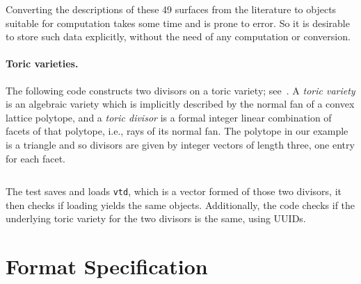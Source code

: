 \documentclass[runningheads]{llncs}
\newcommand\OSCAR{\texttt{OSCAR}\xspace}
\newcommand\msolve{\texttt{msolve}\xspace}
\begin{document}

Converting the descriptions of these 49 surfaces from the literature to objects suitable for computation takes some time and is prone to error.
So it is desirable to store such data explicitly, without the need of any computation or conversion.

\paragraph{Toric varieties.}
 The following code constructs two divisors on a toric variety; see~\cite{toric+varieties}.
 A \emph{toric variety} is an algebraic variety which is implicitly described by the normal fan of a convex lattice polytope,
 and a \emph{toric divisor} is a formal integer linear combination of facets of that polytope, i.e., rays of its normal fan.
 The polytope in our example is a triangle and so divisors are given by integer vectors of length three, one entry for each facet.
 
 \inputminted[fontsize=\footnotesize]{jl}{toric-test.jl}
 
 The test saves and loads \texttt{vtd}, which is a vector formed of those two divisors, it then checks if loading yields the same objects.
 Additionally, the code checks if the underlying toric variety for the two divisors is the same, using UUIDs.


\section{Format Specification}
\label{sec:schema}
\end{document}
